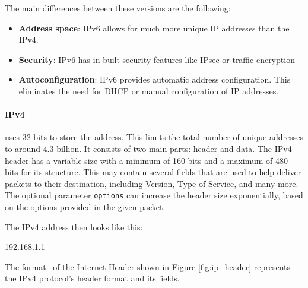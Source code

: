 \documentclass[
  printed,     %
  color,       %
  oneside,     %
  nosansbold,  %
  nocolorbold, %
  nolof,         %
  nolot,         %
]{fithesis4}
\begin{document}
 The main differences between these versions are the following:

 \begin{itemize}[noitemsep,topsep=0pt]
     \item \textbf{Address space}: IPv6 allows for much more unique IP addresses than the IPv4.
     \item \textbf{Security}: IPv6 has in-built security features like IPsec or traffic encryption
     \item \textbf{Autoconfiguration}: IPv6 provides automatic address configuration. This eliminates the need for DHCP or manual configuration of IP addresses.
 \end{itemize}

 \paragraph{IPv4} uses 32 bits to store the address. This limits the total number of unique addresses to around 4.3 billion. It consists of two main parts: header and data. The IPv4 header has a variable size with a minimum of 160 bits and a maximum of 480 bits for its structure. This may contain several fields that are used to help deliver packets to their destination, including Version, Type of Service, and many more. The optional parameter \texttt{options} can increase the header size exponentially, based on the options provided in the given packet.
 
 The IPv4 address then looks like this:

 \begin{center}
    192.168.1.1
\end{center}

The format~\cite{RFC0791} of the Internet Header shown in Figure \ref{fig:ip_header} represents the IPv4 protocol's header format and its fields.
\end{document}
